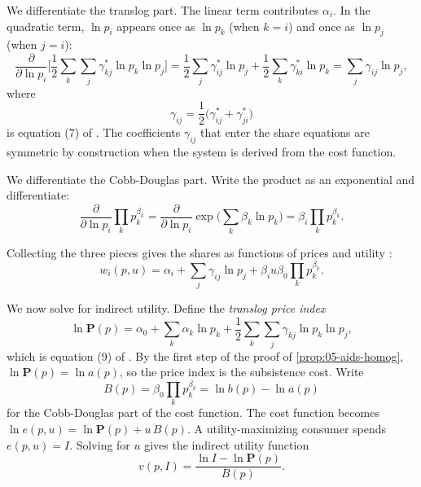  We differentiate the translog part. The linear term contributes $\alpha_i$. In the quadratic term, $\ln p_i$
appears once as $\ln p_k$ (when $k = i$) and once as $\ln p_j$ (when $j = i$):
\begin{equation*}
\frac{\partial}{\partial\ln p_i}\Big[\frac{1}{2}\sum_k\sum_j\gamma^*_{kj}\ln p_k\ln p_j\Big]
= \frac{1}{2}\sum_j\gamma^*_{ij}\ln p_j + \frac{1}{2}\sum_k\gamma^*_{ki}\ln p_k
= \sum_j\gamma_{ij}\ln p_j ,
\end{equation*}
where
\begin{equation}\label{eq:05-gamma-sym}
\gamma_{ij} = \frac{1}{2}\big(\gamma^*_{ij} + \gamma^*_{ji}\big)
\end{equation}
is equation (7) of \citet{DeatonMuellbauer1980a}. The coefficients $\gamma_{ij}$ that enter the share
equations are symmetric by construction when the system is derived from the cost function.

 We differentiate the Cobb-Douglas part. Write the product as an exponential and differentiate:
\begin{equation*}
\frac{\partial}{\partial\ln p_i}\prod_k p_k^{\beta_k} = \frac{\partial}{\partial\ln p_i}
\exp\Big(\sum_k\beta_k\ln p_k\Big) = \beta_i\prod_k p_k^{\beta_k}.
\end{equation*}

 Collecting the three pieces gives the shares as functions of prices and
utility \citep[eq.~6]{DeatonMuellbauer1980a}:
\begin{equation}\label{eq:05-aids-hicks-share}
w_i(p, u) = \alpha_i + \sum_j\gamma_{ij}\ln p_j + \beta_iu\beta_0\prod_k p_k^{\beta_k} .
\end{equation}

 We now solve for indirect utility. Define the \emph{translog price index}
\begin{equation}\label{eq:05-translog}
\ln\mathbf{P}(p) = \alpha_0 + \sum_k\alpha_k\ln p_k + \frac{1}{2}\sum_k\sum_j\gamma_{kj}\ln p_k\ln p_j ,
\end{equation}
which is equation (9) of \citet{DeatonMuellbauer1980a}. By the first step of the proof of
\cref{prop:05-aids-homog}, $\ln\mathbf{P}(p) = \ln a(p)$, so the price index is the subsistence cost. Write
\begin{equation}\label{eq:05-aids-B}
B(p) = \beta_0\prod_k p_k^{\beta_k} = \ln b(p) - \ln a(p)
\end{equation}
for the Cobb-Douglas part of the cost function. The cost function becomes
$\ln e(p, u) = \ln\mathbf{P}(p) + u\,B(p)$. A utility-maximizing consumer spends $e(p, u) = I$. Solving for
$u$ gives the indirect utility function
\begin{equation}\label{eq:05-aids-v}
v(p, I) = \frac{\ln I - \ln\mathbf{P}(p)}{B(p)} .
\end{equation}

